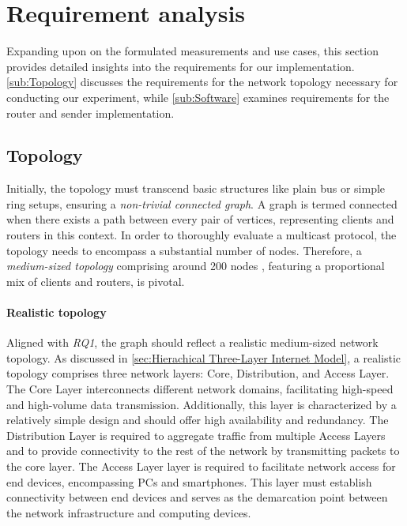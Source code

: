 
\section{Requirement analysis} %
\label{sec:Requirement_Analysis}
Expanding upon on the formulated measurements and use cases, this section
    provides detailed insights into the requirements for our implementation.
\autoref{sub:Topology} discusses the requirements for the network topology
    necessary for conducting our experiment, while \autoref{sub:Software}
    examines requirements for the router and sender implementation.

\subsection{Topology} %
\label{sub:Topology}
Initially, the topology must transcend basic structures like plain bus or simple
    ring setups, ensuring a \textit{non-trivial connected graph}.
A graph is termed connected when there exists a path between every pair of
    vertices, representing clients and routers in this context.
In order to thoroughly evaluate a multicast protocol, the topology needs to
    encompass a substantial number of nodes.
Therefore, a \textit{medium-sized topology} comprising around 200 nodes
    \cite{cisco_net_size}, featuring a proportional mix of clients and routers,
    is pivotal.

\paragraph{Realistic topology} %
\label{par:Realistic topology}
Aligned with \textit{RQ1}, the graph should reflect a realistic medium-sized
    network topology.
As discussed in \autoref{sec:Hierachical Three-Layer Internet Model}, a
    realistic topology comprises three network layers: Core, Distribution, and
    Access Layer.
The Core Layer interconnects different network domains, facilitating high-speed
    and high-volume data transmission.
Additionally, this layer is characterized by a relatively simple design and
    should offer high availability and redundancy.
The Distribution Layer is required to aggregate traffic from multiple Access
    Layers and to provide connectivity to the rest of the network by
    transmitting packets to the core layer.
The Access Layer layer is required to facilitate network access for end
    devices, encompassing PCs and smartphones.
This layer must establish connectivity between end devices and serves as the
    demarcation point between the network infrastructure and computing devices.

